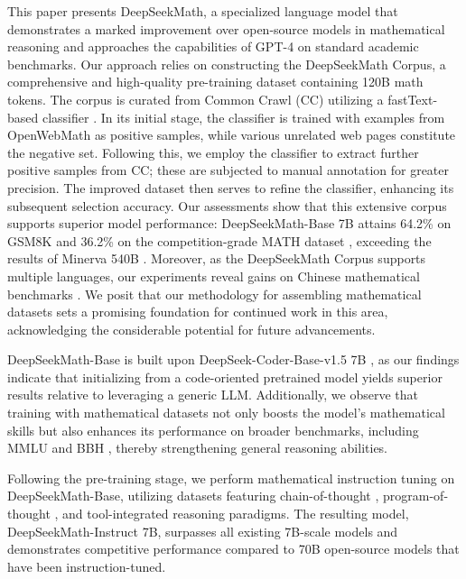 This paper presents DeepSeekMath, a specialized language model that demonstrates a marked improvement over open-source models in mathematical reasoning and approaches the capabilities of GPT-4 on standard academic benchmarks. Our approach relies on constructing the DeepSeekMath Corpus, a comprehensive and high-quality pre-training dataset containing 120B math tokens. The corpus is curated from Common Crawl (CC) utilizing a fastText-based classifier \citep{joulin2016fasttext}. In its initial stage, the classifier is trained with examples from OpenWebMath \citep{openwebmath} as positive samples, while various unrelated web pages constitute the negative set. Following this, we employ the classifier to extract further positive samples from CC; these are subjected to manual annotation for greater precision. The improved dataset then serves to refine the classifier, enhancing its subsequent selection accuracy. Our assessments show that this extensive corpus supports superior model performance: DeepSeekMath-Base 7B attains 64.2\% on GSM8K \citep{gsm8k} and 36.2\% on the competition-grade MATH dataset \citep{MATH}, exceeding the results of Minerva 540B \citep{minerva}. Moreover, as the DeepSeekMath Corpus supports multiple languages, our experiments reveal gains on Chinese mathematical benchmarks \citep{wei2023cmath,agieval}. We posit that our methodology for assembling mathematical datasets sets a promising foundation for continued work in this area, acknowledging the considerable potential for future advancements.

DeepSeekMath-Base is built upon DeepSeek-Coder-Base-v1.5 7B \citep{deepseek-coder}, as our findings indicate that initializing from a code-oriented pretrained model yields superior results relative to leveraging a generic LLM. Additionally, we observe that training with mathematical datasets not only boosts the model's mathematical skills but also enhances its performance on broader benchmarks, including MMLU \citep{mmlu} and BBH \citep{bbh}, thereby strengthening general reasoning abilities.

Following the pre-training stage, we perform mathematical instruction tuning on DeepSeekMath-Base, utilizing datasets featuring chain-of-thought \citep{cot}, program-of-thought \citep{pot,pal}, and tool-integrated reasoning \citep{tora} paradigms. The resulting model, DeepSeekMath-Instruct 7B, surpasses all existing 7B-scale models and demonstrates competitive performance compared to 70B open-source models that have been instruction-tuned.

